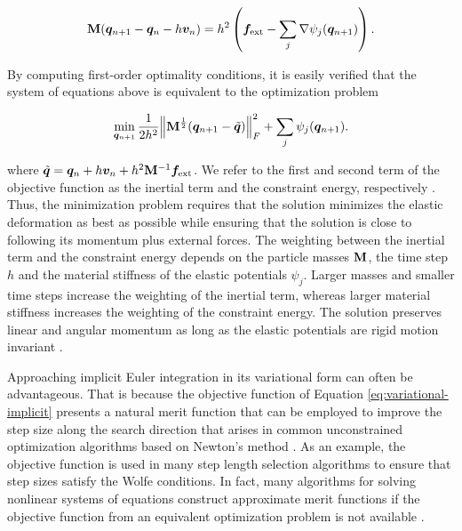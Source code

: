 \begin{equation}\label{eq:implicit-positional-detailed}
    \mathbf{M}(\bm{q}_{n+1} - \bm{q}_n - h\bm{v}_n) = h^2\left(\bm{f_\text{ext}} - \sum_j \nabla \psi_j(\bm{q}_{n+1})\right).
\end{equation}

\noindent By computing first-order optimality conditions, it is easily verified that the system of equations above is equivalent to the optimization 
problem

\begin{equation}\label{eq:variational-implicit}
    \min_{\bm{q}_{n+1}} \frac{1}{2h^2} \norm{\mathbf{M}^{\frac{1}{2}}(\bm{q}_{n+1} - \tilde{\bm{q}})}^2_F + \sum_j \psi_j(\bm{q}_{n+1}).
\end{equation}

\noindent where $\tilde{\bm{q}} = \bm{q}_n + h\bm{v}_n + h^2\mathbf{M}^{-1}\bm{f}_{\text{ext}}$.  
We refer to the first and second term of the objective function as the inertial term and the constraint energy, respectively \cite{bouaziz2014}. 
Thus, the minimization problem requires that the solution minimizes the elastic deformation as best as possible while ensuring that the solution is 
close to following its momentum plus external forces. The weighting between the inertial term and the constraint energy depends on the 
particle masses $\mathbf{M}$, the time step $h$ and the material stiffness of the elastic potentials $\psi_j$. Larger masses and smaller time steps 
increase the weighting of the inertial term, whereas larger material stiffness increases the weighting of the constraint energy. 
The solution preserves linear and angular momentum as long as the elastic potentials are rigid motion invariant \cite{bouaziz2014}.

Approaching implicit Euler integration in its variational form can often be advantageous. That is because the objective function of 
Equation \ref{eq:variational-implicit} presents a natural merit function that can be employed to improve the step size along the search direction 
that arises in common unconstrained optimization algorithms based on Newton's method \cite{nocedal2006}. As an example, the objective 
function is used in many step length selection algorithms to ensure that step sizes satisfy the Wolfe conditions. In fact, many algorithms for 
solving nonlinear systems of equations construct approximate merit functions if the objective function from an equivalent optimization problem 
is not available \cite{nocedal2006}.


